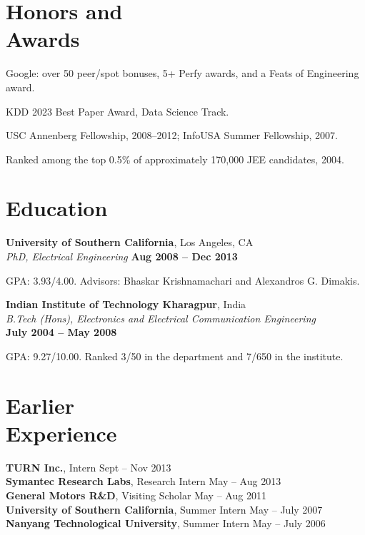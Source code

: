 \begin{resume}
\section{\mysidestyle Honors and\\Awards}
\begin{list2}
  \item Google: over 50 peer/spot bonuses, 5+ Perfy awards, and a Feats of Engineering award.
  \item KDD 2023 Best Paper Award, Data Science Track.
  \item USC Annenberg Fellowship, 2008--2012; InfoUSA Summer Fellowship, 2007.
  \item Ranked among the top 0.5\% of approximately 170,000 JEE candidates, 2004.
\end{list2}

\section{\mysidestyle Education}
\textbf{University of Southern California}, Los Angeles, CA\\
\textsl{PhD, Electrical Engineering} \hfill \textbf{Aug 2008 -- Dec 2013}
\begin{list2}
  \item GPA: 3.93/4.00. Advisors: Bhaskar Krishnamachari and Alexandros G. Dimakis.
\end{list2}

\textbf{Indian Institute of Technology Kharagpur}, India\\
\textsl{B.Tech (Hons), Electronics and Electrical Communication Engineering}\\
\mbox{}\hfill \textbf{July 2004 -- May 2008}
\begin{list2}
  \item GPA: 9.27/10.00. Ranked 3/50 in the department and 7/650 in the institute.
\end{list2}

\section{\mysidestyle Earlier\\Experience}
\textbf{TURN Inc.}, Intern \hfill Sept -- Nov 2013\\
\textbf{Symantec Research Labs}, Research Intern \hfill May -- Aug 2013\\
\textbf{General Motors R\&D}, Visiting Scholar \hfill May -- Aug 2011\\
\textbf{University of Southern California}, Summer Intern \hfill May -- July 2007\\
\textbf{Nanyang Technological University}, Summer Intern \hfill May -- July 2006


\end{resume}
